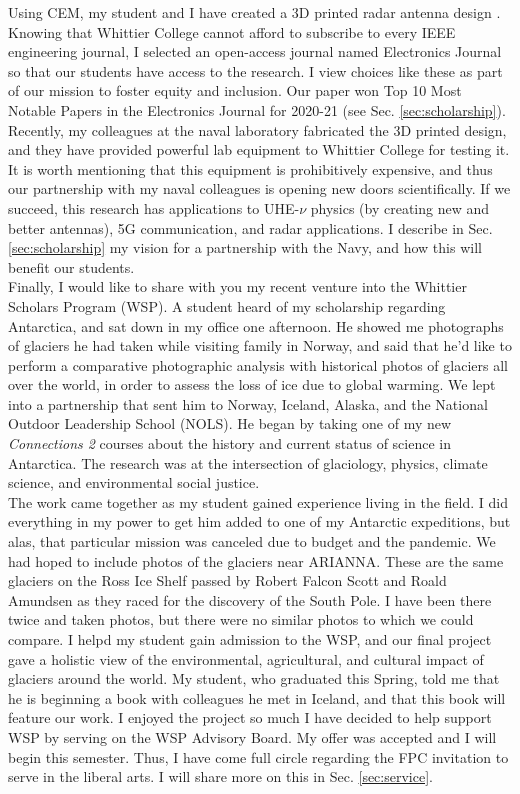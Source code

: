 \documentclass[../../main.tex]{subfiles}
\begin{document}
Using CEM, my student and I have created a 3D printed radar antenna design \cite{10.1016/j.cpc.2009.11.008}.  Knowing that Whittier College cannot afford to subscribe to every IEEE engineering journal, I selected an open-access journal named Electronics Journal so that our students have access to the research.  I view choices like these as part of our mission to foster equity and inclusion.  Our paper won Top 10 Most Notable Papers in the Electronics Journal for 2020-21 (see Sec. \ref{sec:scholarship}).  Recently, my colleagues at the naval laboratory fabricated the 3D printed design, and they have provided powerful lab equipment to Whittier College for testing it.  It is worth mentioning that this equipment is prohibitively expensive, and thus our partnership with my naval colleagues is opening new doors scientifically.  If we succeed, this research has applications to UHE-$\nu$ physics (by creating new and better antennas), 5G communication, and radar applications.  I describe in Sec. \ref{sec:scholarship} my vision for a partnership with the Navy, and how this will benefit our students.
\\
\vspace{0.25cm}
Finally, I would like to share with you my recent venture into the Whittier Scholars Program (WSP).  A student heard of my scholarship regarding Antarctica, and sat down in my office one afternoon.  He showed me photographs of glaciers he had taken while visiting family in Norway, and said that he'd like to perform a comparative photographic analysis with historical photos of glaciers all over the world, in order to assess the loss of ice due to global warming.  We lept into a partnership that sent him to Norway, Iceland, Alaska, and the National Outdoor Leadership School (NOLS).  He began by taking one of my new \textit{Connections 2} courses about the history and current status of science in Antarctica.  The research was at the intersection of glaciology, physics, climate science, and environmental social justice.
\\
\vspace{0.25cm}
The work came together as my student gained experience living in the field.  I did everything in my power to get him added to one of my Antarctic expeditions, but alas, that particular mission was canceled due to budget and the pandemic.  We had hoped to include photos of the glaciers near ARIANNA.  These are the same glaciers on the Ross Ice Shelf passed by Robert Falcon Scott and Roald Amundsen as they raced for the discovery of the South Pole.  I have been there twice and taken photos, but there were no similar photos to which we could compare.  I helpd my student gain admission to the WSP, and our final project gave a holistic view of the environmental, agricultural, and cultural impact of glaciers around the world.  My student, who graduated this Spring, told me that he is beginning a book with colleagues he met in Iceland, and that this book will feature our work.  I enjoyed the project so much I have decided to help support WSP by serving on the WSP Advisory Board.  My offer was accepted and I will begin this semester.  Thus, I have come full circle regarding the FPC invitation to serve in the liberal arts.  I will share more on this in Sec. \ref{sec:service}.
\end{document}
